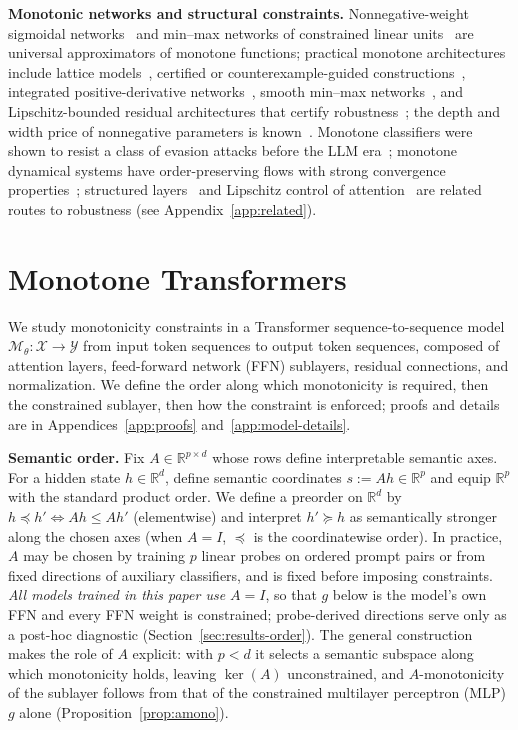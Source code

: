 \documentclass{article}
\theoremstyle{plain}
\theoremstyle{definition}
\theoremstyle{remark}
\theoremstyle{plain}
\begin{document}
\textbf{Monotonic networks and structural constraints.}
Nonnegative-weight sigmoidal networks~\citep{Daniels2010Monotone} and min--max networks of constrained linear units~\citep{Sill1998MonotonicNetworks} are universal approximators of monotone functions; practical monotone architectures include lattice models~\citep{Gupta2016MonotonicLattices,You2017DeepLattice}, certified or counterexample-guided constructions~\citep{liu2020certified,sivaraman2020counterexample}, integrated positive-derivative networks~\citep{wehenkel2019unconstrained}, smooth min--max networks~\citep{igel2024smooth}, and Lipschitz-bounded residual architectures that certify robustness~\citep{nolte2023expressive,kitouni2023robust}; the depth and width price of nonnegative parameters is known~\citep{mikulincer2022size}. Monotone classifiers were shown to resist a class of evasion attacks before the LLM era~\citep{incer2018adversarially}; monotone dynamical systems have order-preserving flows with strong convergence properties~\citep{hirsch2006monotone,angeli2003monotone}; structured layers~\citep{Amos2017OptNet} and Lipschitz control of attention~\citep{kim2021lipschitz,newhouse2025training} are related routes to robustness (see Appendix~\ref{app:related}).

\section{Monotone Transformers}
\label{Prelim}
We study monotonicity constraints in a Transformer sequence-to-sequence model $\mathcal{M}_\theta : \mathcal{X} \to \mathcal{Y}$ from input token sequences to output token sequences, composed of attention layers, feed-forward network (FFN) sublayers, residual connections, and normalization. We define the order along which monotonicity is required, then the constrained sublayer, then how the constraint is enforced; proofs and details are in Appendices~\ref{app:proofs} and~\ref{app:model-details}.

\textbf{Semantic order.}
Fix $A \in \mathbb{R}^{p \times d}$ whose rows define interpretable semantic axes.
For a hidden state $h \in \mathbb{R}^d$, define semantic coordinates $s := Ah \in \mathbb{R}^p$
and equip $\mathbb{R}^p$ with the standard product order. We define a preorder on
$\mathbb{R}^d$ by $h \preceq h' \Longleftrightarrow Ah \le Ah'$ (elementwise)
and interpret $h' \succeq h$ as semantically stronger along the chosen axes (when $A = I$, $\preceq$ is the coordinatewise order).
In practice, $A$ may be chosen by training $p$ linear probes on ordered prompt pairs or from fixed directions of auxiliary classifiers, and is fixed before imposing constraints. \emph{All models trained in this paper use $A = I$}, so that $g$ below is the model's own FFN and every FFN weight is constrained; probe-derived directions serve only as a post-hoc diagnostic (Section~\ref{sec:results-order}). The general construction makes the role of $A$ explicit: with $p < d$ it selects a semantic subspace along which monotonicity holds, leaving $\ker(A)$ unconstrained, and $A$-monotonicity of the sublayer follows from that of the constrained multilayer perceptron (MLP) $g$ alone (Proposition~\ref{prop:amono}).
\end{document}
